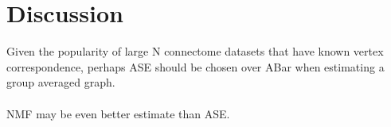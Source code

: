 \section{Discussion}

Given the popularity of large N connectome datasets that have known vertex correspondence, perhaps ASE should be chosen over ABar when estimating a group averaged graph.\\\\
NMF may be even better estimate than ASE.
\cite{Ho2008}